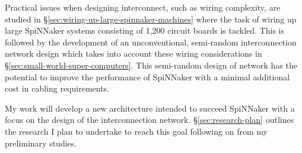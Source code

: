 		Practical issues when designing interconnect, such as wiring complexity, are
		studied in \S\ref{sec:wiring-up-large-spinnaker-machines} where the task of
		wiring up large SpiNNaker systems consisting of 1,200 circuit boards is
		tackled. This is followed by the development of an unconventional,
		semi-random interconnection network design which takes into account these
		wiring considerations in \S\ref{sec:small-world-super-computers}. This
		semi-random design of network has the potential to improve the performance
		of SpiNNaker with a minimal additional cost in cabling requirements.
	
	
		My work will develop a new architecture intended to succeed SpiNNaker with a
		focus on the design of the interconnection network.
		\S\ref{sec:research-plan} outlines the research I plan to undertake to reach
		this goal following on from my preliminary studies.
